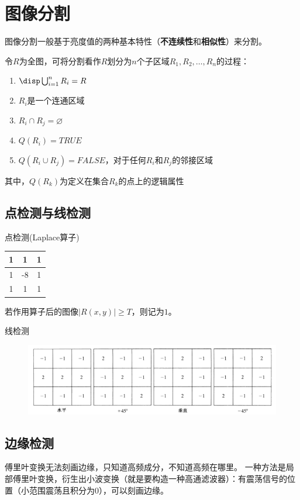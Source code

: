 
\section{图像分割}
图像分割一般基于亮度值的两种基本特性（\textbf{不连续性}和\textbf{相似性}）来分割。

\begin{definition}[分割]
令$R$为全图，可将分割看作$R$划分为$n$个子区域$R_1,R_2,\ldots,R_n$的过程：
\begin{enumerate}
	\item $\disp\bigcup_{i=1}^n R_i=R$
	\item $R_i$是一个连通区域
	\item $R_i\cap R_j=\varnothing$
	\item $Q(R_i)=TRUE$
	\item $Q(R_i\cup R_j)=FALSE$，对于任何$R_i$和$R_j$的邻接区域
\end{enumerate}
其中，$Q(R_k)$为定义在集合$R_k$的点上的逻辑属性
\end{definition}

\subsection{点检测与线检测}
点检测(Laplace算子)
\begin{center}
\begin{tabular}{|c|c|c|}\hline
1 & 1 & 1\\\hline
1 & -8 & 1\\\hline
1 & 1 & 1
\end{tabular}
\end{center}
若作用算子后的图像$|R(x,y)|\geq T$，则记为$1$。

线检测
\begin{figure}[H]
\centering
\includegraphics[width=0.9\linewidth]{fig/line_detect.png}
\end{figure}

\subsection{边缘检测}
傅里叶变换无法刻画边缘，只知道高频成分，不知道高频在哪里。
一种方法是局部傅里叶变换，衍生出小波变换（就是要构造一种高通滤波器）：有震荡信号的位置（小范围震荡且积分为0），可以刻画边缘。

